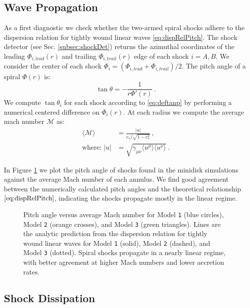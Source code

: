 \documentclass{emulateapj}
\newcommand{\model}[1]{{Model \texttt{#1}}}
\begin{document}
\subsection{Wave Propagation}
\label{subsec:res-prop}

As a first diagnostic we check whether the two-armed spiral shocks adhere to the dispersion relation for tightly wound linear waves \eqref{eq:dispRelPitch}.  The shock detector (see Sec. \ref{subsec:shockDet}) returns the azimuthal coordinates of the leading $\Phi_{i,lead}(r)$ and trailing $\Phi_{i,trail}(r)$ edge of each shock $i=A,B$.  We consider the center of each shock $\Phi_i = (\Phi_{i,lead} + \Phi_{i,trail}) / 2$.  The pitch angle of a spiral $\Phi(r)$ is:
\begin{equation}
	\tan \theta = -\frac{1}{r \Phi'(r)} \ . \label{eq:deftanp} 
\end{equation}
We compute $\tan \theta_i$ for each shock according to \eqref{eq:deftanp} by performing a numerical centered difference on $\Phi_i(r)$.  At each radius we compute the average mach number $\mathcal{M}$ as:
\begin{align}
	\langle \mathcal{M} \rangle &=  \frac{|u|}{c_s / \sqrt{1-c_s^2}} \ , \\
	\text{where: } |u| &= \sqrt{\gamma_{\mu\nu} \langle u^\mu \rangle  \langle u^\nu \rangle} \nonumber \ .
\end{align}

In Figure \ref{fi:disp} we plot the pitch angle of shocks found in the minidisk simulations against the average Mach number of each annulus. We find good agreement between the numerically calculated pitch angles and the theoretical relationship $\eqref{eq:dispRelPitch}$, indicating the shocks propagate mostly in the linear regime.

\begin{figure}
\caption{\label{fi:disp} Pitch angle versus average Mach number for \model{1} (blue circles), \model{2} (orange crosses), and \model{3} (green triangles). Lines are the analytic prediction from the dispersion relation for tightly wound linear waves for \model{1} (solid), \model{2} (dashed), and \model{3} (dotted).  Spiral shocks propagate in a nearly linear regime, with better agreement at higher Mach numbers and lower accretion rates.}
\end{figure}



\subsection{Shock Dissipation}
\label{subsec:diss}
\end{document}

